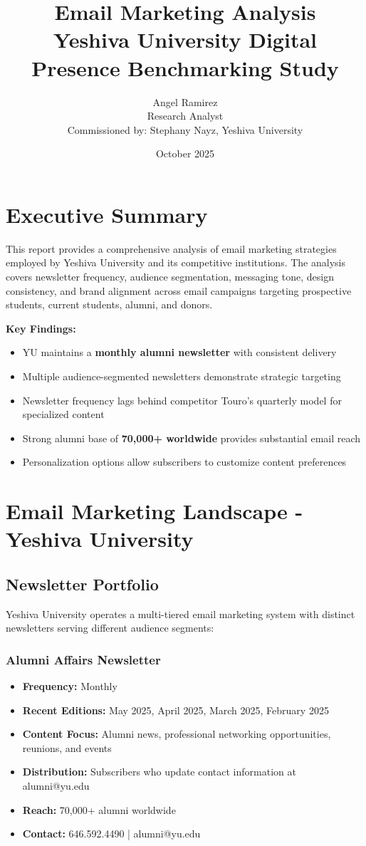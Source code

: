 \documentclass[12pt,letterpaper]{article}
\title{\textbf{Email Marketing Analysis}\\
\large Yeshiva University Digital Presence Benchmarking Study}
\author{Angel Ramirez\\
\small Research Analyst\\
\small Commissioned by: Stephany Nayz, Yeshiva University}
\date{October 2025}
\begin{document}
\maketitle

\section*{Executive Summary}

This report provides a comprehensive analysis of email marketing strategies employed by Yeshiva University and its competitive institutions. The analysis covers newsletter frequency, audience segmentation, messaging tone, design consistency, and brand alignment across email campaigns targeting prospective students, current students, alumni, and donors.

\textbf{Key Findings:}
\begin{itemize}[leftmargin=*]
    \item YU maintains a \textbf{monthly alumni newsletter} with consistent delivery
    \item Multiple audience-segmented newsletters demonstrate strategic targeting
    \item Newsletter frequency lags behind competitor Touro's quarterly model for specialized content
    \item Strong alumni base of \textbf{70,000+ worldwide} provides substantial email reach
    \item Personalization options allow subscribers to customize content preferences
\end{itemize}

\section{Email Marketing Landscape - Yeshiva University}

\subsection{Newsletter Portfolio}

Yeshiva University operates a multi-tiered email marketing system with distinct newsletters serving different audience segments:

\subsubsection{Alumni Affairs Newsletter}
\begin{itemize}[leftmargin=*]
    \item \textbf{Frequency:} Monthly
    \item \textbf{Recent Editions:} May 2025, April 2025, March 2025, February 2025
    \item \textbf{Content Focus:} Alumni news, professional networking opportunities, reunions, and events
    \item \textbf{Distribution:} Subscribers who update contact information at alumni@yu.edu
    \item \textbf{Reach:} 70,000+ alumni worldwide
    \item \textbf{Contact:} 646.592.4490 | alumni@yu.edu
\end{itemize}
\end{document}
